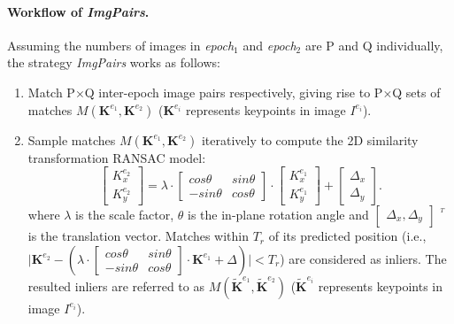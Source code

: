 \paragraph{Workflow of \textit{ImgPairs}.} Assuming the numbers of images in \textit{epoch$_1$} and \textit{epoch$_2$} are P and Q individually, the strategy \textit{ImgPairs} works as follows:\\
\begin{enumerate}
    \item Match P$\times$Q inter-epoch image pairs respectively, giving rise to P$\times$Q sets of matches $M({\mathbf{K}^{e_1},\mathbf{K}^{e_2}})$ ($\mathbf{K}^{e_i}$ represents keypoints in image $I^{e_i}$).
    \item Sample matches $M({\mathbf{K}^{e_1},\mathbf{K}^{e_2}})$ iteratively to compute the 2D similarity transformation RANSAC model:
    \begin{equation}
    \left [ \begin{array}{c}
    {K}_x^{e_2}\\
    {K}_y^{e_2}
    \end{array}
    \right ] =\lambda \cdot { \left[ \begin{array}{cc}
    	cos\theta & sin\theta\\
    	-sin\theta & cos\theta
    	\end{array} 
    	\right ]} \cdot {\left [ \begin{array}{c}
    	{K}_x^{e_1}\\
    	{K}_y^{e_1}
    	\end{array}
    	\right ]} + \left [ \begin{array}{c}
    \Delta_x\\
    \Delta_y
    \end{array}
    \right ]. \label{eq:2DSim}
    \end{equation}
    where $\lambda$ is the scale factor, $\theta$ is the in-plane rotation angle and $\left [ \begin{array}{c}
    \Delta_x, \Delta_y
    \end{array}
    \right ]$ $^{^T}$ is the translation vector.
    Matches within $T_r$ of its predicted position (i.e., $\lvert \mathbf{K}^{e_2} - (\lambda \cdot {\left[ \begin{array}{cc}
    		cos\theta & sin\theta\\
    		-sin\theta & cos\theta
    		\end{array} 
    		\right]} \cdot \mathbf{K}^{e_1} + \Delta) \rvert < T_r$) are considered as inliers. The resulted inliers are referred to as $M({\mathbf{\widetilde{K}}^{e_1},\mathbf{\widetilde{K}}^{e_2}})$ ($\mathbf{\widetilde{K}}^{e_i}$ represents keypoints in image $I^{e_i}$).\\

\end{enumerate}

